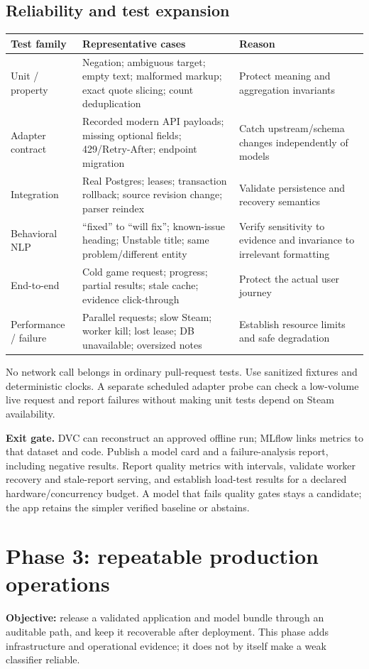 \documentclass[10pt,letterpaper]{article}
\newcommand{\key}[1]{\textbf{\color{ink}#1}}
\newcommand{\nextsection}[1]{\clearpage\section{#1}}
\begin{document}
\subsection{Reliability and test expansion}
\begin{tabularx}{\linewidth}{p{1.2in}YY}
\toprule
Test family & Representative cases & Reason \\
\midrule
Unit / property & Negation; ambiguous target; empty text; malformed markup; exact quote slicing; count deduplication & Protect meaning and aggregation invariants \\
Adapter contract & Recorded modern API payloads; missing optional fields; 429/Retry-After; endpoint migration & Catch upstream/schema changes independently of models \\
Integration & Real Postgres; leases; transaction rollback; source revision change; parser reindex & Validate persistence and recovery semantics \\
Behavioral NLP & ``fixed'' to ``will fix''; known-issue heading; Unstable title; same problem/different entity & Verify sensitivity to evidence and invariance to irrelevant formatting \\
End-to-end & Cold game request; progress; partial results; stale cache; evidence click-through & Protect the actual user journey \\
Performance / failure & Parallel requests; slow Steam; worker kill; lost lease; DB unavailable; oversized notes & Establish resource limits and safe degradation \\
\bottomrule
\end{tabularx}

No network call belongs in ordinary pull-request tests. Use sanitized fixtures and deterministic clocks. A separate scheduled adapter probe can check a low-volume live request and report failures without making unit tests depend on Steam availability.

\key{Exit gate.} DVC can reconstruct an approved offline run; MLflow links metrics to that dataset and code. Publish a model card and a failure-analysis report, including negative results. Report quality metrics with intervals, validate worker recovery and stale-report serving, and establish load-test results for a declared hardware/concurrency budget. A model that fails quality gates stays a candidate; the app retains the simpler verified baseline or abstains.

\nextsection{Phase 3: repeatable production operations}
\key{Objective:} release a validated application and model bundle through an auditable path, and keep it recoverable after deployment. This phase adds infrastructure and operational evidence; it does not by itself make a weak classifier reliable.
\end{document}
